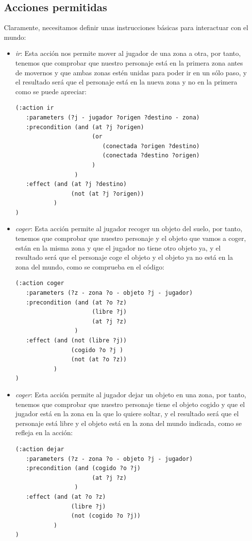 \documentclass[a4paper, 11pt]{article}
\begin{document}
	\subsection{Acciones permitidas}
		Claramente, necesitamos definir unas instrucciones básicas para interactuar con el mundo:
		\begin{itemize}
			\item \textit{ir}: Esta acción nos permite mover al jugador de una zona a otra, por tanto,
			tenemos que comprobar que nuestro personaje está en la primera zona antes de movernos y que
			ambas zonas estén unidas para poder ir en un sólo paso, y el resultado será que el personaje
			está en la nueva zona y no en la primera como se puede apreciar:
			\begin{verbatim}
(:action ir
   :parameters (?j - jugador ?origen ?destino - zona)
   :precondition (and (at ?j ?origen)
                      (or
                         (conectada ?origen ?destino)
                         (conectada ?destino ?origen)
                      )
                 )
   :effect (and (at ?j ?destino)
                (not (at ?j ?origen))
           )
)
			\end{verbatim}
			
			\item \textit{coger}: Esta acción permite al jugador recoger un objeto del suelo, por tanto,
			tenemos que comprobar que nuestro personaje y el objeto que vamos a coger, están en la misma
			zona y que el jugador no tiene otro objeto ya, y el resultado será que el personaje coge el
			objeto y el objeto ya no está en la zona del mundo, como se comprueba en el código:
			\begin{verbatim}
(:action coger
   :parameters (?z - zona ?o - objeto ?j - jugador)
   :precondition (and (at ?o ?z)
                      (libre ?j)
                      (at ?j ?z)
                 )
   :effect (and (not (libre ?j))
                (cogido ?o ?j )
                (not (at ?o ?z))
           )
)
			\end{verbatim}

			\item \textit{coger}: Esta acción permite al jugador dejar un objeto en una zona, por tanto,
			tenemos que comprobar que nuestro personaje tiene el objeto cogido y que el jugador está en
			la zona en la que lo quiere soltar, y el resultado será que el personaje está libre y el
			objeto está en la zona del mundo indicada, como se refleja en la acción:
			\begin{verbatim}
(:action dejar
   :parameters (?z - zona ?o - objeto ?j - jugador)
   :precondition (and (cogido ?o ?j)
                      (at ?j ?z)
                 )
   :effect (and (at ?o ?z)
                (libre ?j)
                (not (cogido ?o ?j))
           )
)
			\end{verbatim}


\end{itemize}
\end{document}
